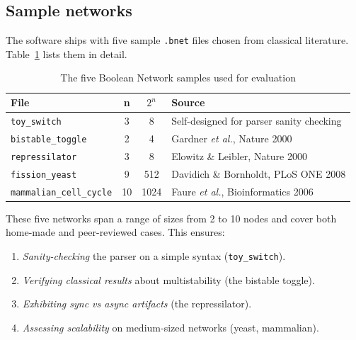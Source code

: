 \documentclass[oneside,final]{hcmut-report}
\begin{document}
\subsection{Sample networks}\label{subsec:samples}

The software ships with five sample \texttt{.bnet} files chosen from classical literature. Table~\ref{tab:samples} lists them in detail.

\begin{table}[H]
    \centering
    \renewcommand{\arraystretch}{1.3}
    \small
    \begin{tabular}{|p{}|c|c|p{}|}
        \hline
        \rowcolor{bklight}
        \textbf{File} & \textbf{n} & \textbf{$2^n$} & \textbf{Source} \\
        \hline
        \texttt{toy\_switch} & 3 & 8 & Self-designed for parser sanity checking \\
        \hline
        \texttt{bistable\_toggle} & 2 & 4 & Gardner \emph{et al.}, Nature 2000 \cite{gardner2000toggle} \\
        \hline
        \texttt{repressilator} & 3 & 8 & Elowitz \& Leibler, Nature 2000 \cite{elowitz2000repressilator} \\
        \hline
        \texttt{fission\_yeast} & 9 & 512 & Davidich \& Bornholdt, PLoS ONE 2008 \cite{davidich2008} \\
        \hline
        \texttt{mammalian\_cell\_cycle} & 10 & 1024 & Faure \emph{et al.}, Bioinformatics 2006 \cite{faure2006} \\
        \hline
    \end{tabular}
    \caption{The five Boolean Network samples used for evaluation}
    \label{tab:samples}
\end{table}

These five networks span a range of sizes from 2 to 10 nodes and cover both home-made and peer-reviewed cases. This ensures:
\begin{enumerate}[leftmargin=*]
    \item \textit{Sanity-checking} the parser on a simple syntax (\texttt{toy\_switch}).
    \item \textit{Verifying classical results} about multistability (the bistable toggle).
    \item \textit{Exhibiting sync vs async artifacts} (the repressilator).
    \item \textit{Assessing scalability} on medium-sized networks (yeast, mammalian).
\end{enumerate}
\end{document}
